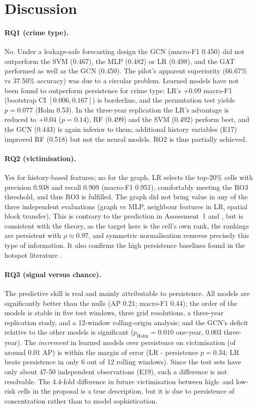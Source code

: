 \documentclass[11pt,a4paper]{report}
\begin{document}
\section{Discussion}
\paragraph{RQ1 (crime type).} No. Under a leakage-safe forecasting design the GCN (macro-F1 0.450) did not outperform the SVM (0.467), the MLP (0.482) or LR (0.498), and the GAT performed as well as the GCN (0.450). The pilot's apparent superiority (66.67\% vs 37.50\% accuracy) was due to a circular problem. Learned models have not been found to outperform persistence for crime type: LR's $+0.09$ macro-F1 (bootstrap CI $[0.006, 0.167]$) is borderline, and the permutation test yields $p=0.077$ (Holm 0.53). In the three-year replication the LR's advantage is reduced to $+0.04$ ($p=0.14$), RF (0.499) and the SVM (0.492) perform best, and the GCN (0.443) is again inferior to them; additional history variables (E17) improved RF (0.518) but not the neural models. RO2 is thus partially achieved.

\paragraph{RQ2 (victimisation).} Yes for history-based features; no for the graph. LR selects the top-20\% cells with precision 0.938 and recall 0.909 (macro-F1 0.951), comfortably meeting the RO3 threshold, and thus RO3 is fulfilled. The graph did not bring value in any of the three independent evaluations (graph vs MLP, neighbour features in LR, spatial block transfer). This is contrary to the prediction in Assessment~1 and \citet{zubair2025}, but is consistent with the theory, as the target here is the cell's own rank, the rankings are persistent with $\rho\approx0.97$, and symmetric normalisation removes precisely this type of information. It also confirms the high persistence baselines found in the hotspot literature \citep{chainey2008,bowers2004}.

\paragraph{RQ3 (signal versus chance).} The predictive skill is real and mainly attributable to persistence. All models are significantly better than the nulls (AP 0.21; macro-F1 0.44); the order of the models is stable in five test windows, three grid resolutions, a three-year replication study, and a 12-window rolling-origin analysis; and the GCN's deficit relative to the other models is significant ($p_\mathrm{Holm}=0.010$ one-year, 0.003 three-year). The \emph{increment} in learned models over persistence on victimisation (of around 0.01 AP) is within the margin of error (LR - persistence $p = 0.34$; LR beats persistence in only 6 out of 12 rolling windows). Since the test sets have only about 47-50 independent observations (E19), such a difference is not resolvable. The 4.4-fold difference in future victimisation between high- and low-risk cells in the proposal is a true description, but it is due to persistence of concentration rather than to model sophistication.
\end{document}
